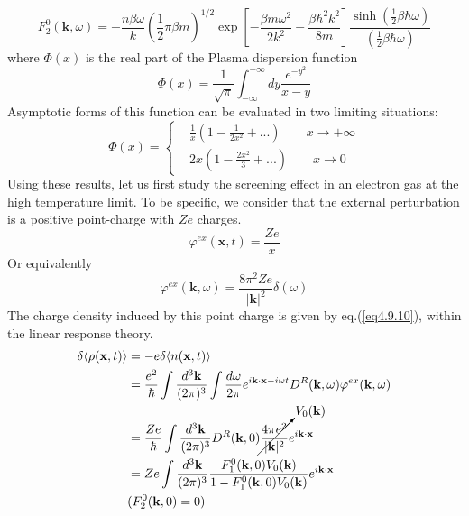 \begin{equation}\label{eq4.9.41}
F^0_2(\mathbf k,\omega)=-\frac{n\beta\omega}{k} \left( \frac{1}{2} \pi \beta m\right)^{1/2} \exp\left[ -\frac{\beta m\omega^2}{2k^2}-\frac{\beta\hbar^2 k^2}{8m} \right] \frac{\sinh \left( \frac{1}{2} \beta \hbar \omega \right)}{ \left( \frac{1}{2} \beta \hbar \omega \right)}
\end{equation}
where $\Phi(x)$ is the real part of the Plasma dispersion function
\begin{equation}
\Phi(x)=\frac{1}{\sqrt \pi} \int_{-\infty}^{+\infty} dy \frac{e^{-y^2}}{x-y}
\end{equation}
 Asymptotic forms of this function can be evaluated in two limiting situations:
\begin{equation}
\Phi(x)=
\left\{
\begin{aligned}
&\frac{1}{x}(1-\frac{1}{2x^2}+...)\qquad x\to+\infty\\
&2x(1-\frac{2x^2}{3}+...)\qquad x\to 0
\end{aligned}
\right.
\end{equation}
 Using these results, let us first study the screening effect in an electron gas at the high temperature limit.
 To be specific, we consider that the external perturbation is a positive point-charge with $Ze$ charges.
\begin{equation}
\varphi^{ex}(\mathbf x,t)=\frac{Ze}{x}
\end{equation}
Or equivalently
\begin{equation}\tag{4.9.44'}
\varphi^{ex}(\mathbf k,\omega)=\frac{8\pi^2Ze}{|\mathbf k|^2} \delta(\omega)
\end{equation}
The charge density induced by this point charge is given by eq.(\ref{eq4.9.10}), within the linear response theory.
\begin{equation}\label{eq4.9.45}
\begin{aligned}
\delta\langle\rho(\mathbf x,t)\rangle&=-e\delta\langle n(\mathbf x,t)\rangle\\
&=\frac{e^2}{\hbar}\int \frac{d^3\mathbf k}{(2\pi)^3} \int\frac{d\omega}{2\pi} e^{i\mathbf k\cdot \mathbf x-i\omega t}D^R(\mathbf k,\omega)\varphi^{ex}(\mathbf k,\omega)\\
&=\frac{Ze}{\hbar} \int \frac{d^3\mathbf k}{(2\pi)^3} D^R(\mathbf k,0) \cancelto{V_0(\mathbf k)}{\frac{4\pi e^2}{|\mathbf k|^2}} e^{i\mathbf k\cdot \mathbf x}\\
&=Ze\int \frac{d^3\mathbf k}{(2\pi)^3}\frac{F^0_1(\mathbf k,0)V_0(\mathbf k)}{1-F^0_1(\mathbf k,0)V_0(\mathbf k)} e^{i\mathbf k\cdot \mathbf x}\\
&(F_2^0(\mathbf k,0)=0)
\end{aligned}
\end{equation}
